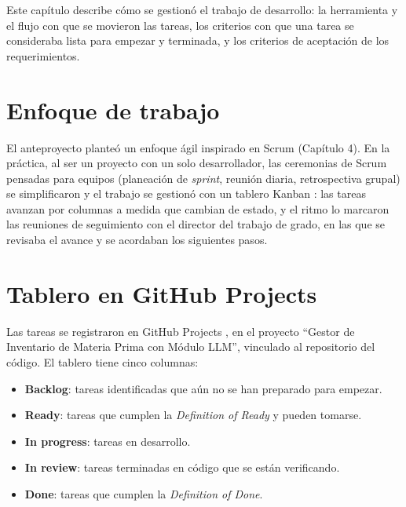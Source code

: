 
Este capítulo describe cómo se gestionó el trabajo de desarrollo: la herramienta y el flujo con que se movieron las tareas, los criterios con que una tarea se consideraba lista para empezar y terminada, y los criterios de aceptación de los requerimientos.

\section{Enfoque de trabajo}
\label{sec:ges_enfoque}

El anteproyecto planteó un enfoque ágil inspirado en Scrum (Capítulo 4). En la práctica, al ser un proyecto con un solo desarrollador, las ceremonias de Scrum pensadas para equipos (planeación de \textit{sprint}, reunión diaria, retrospectiva grupal) se simplificaron y el trabajo se gestionó con un tablero Kanban \cite{kanban_method}: las tareas avanzan por columnas a medida que cambian de estado, y el ritmo lo marcaron las reuniones de seguimiento con el director del trabajo de grado, en las que se revisaba el avance y se acordaban los siguientes pasos.

\section{Tablero en GitHub Projects}
\label{sec:ges_tablero}

Las tareas se registraron en GitHub Projects \cite{github_projects}, en el proyecto ``Gestor de Inventario de Materia Prima con Módulo LLM'', vinculado al repositorio del código. El tablero tiene cinco columnas:

\begin{itemize}
    \item \textbf{Backlog}: tareas identificadas que aún no se han preparado para empezar.
    \item \textbf{Ready}: tareas que cumplen la \textit{Definition of Ready} y pueden tomarse.
    \item \textbf{In progress}: tareas en desarrollo.
    \item \textbf{In review}: tareas terminadas en código que se están verificando.
    \item \textbf{Done}: tareas que cumplen la \textit{Definition of Done}.
\end{itemize}

